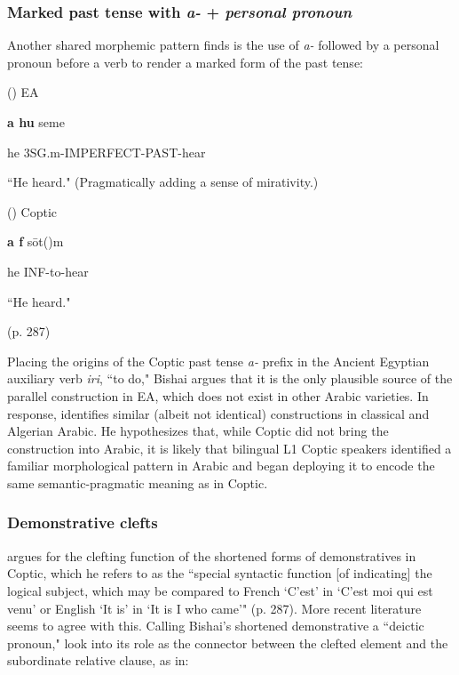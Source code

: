 \documentclass[12pt,a4paper]{article}
\newcounter{example}
\begin{document}
\subsubsection{Marked past tense with \textit{a-} + \textit{personal pronoun}}

Another shared morphemic pattern \textcite{bishai_coptic_1962} finds is the use of \textit{a-} followed by a personal pronoun before a verb to render a marked form of the past tense:

\vspace{3mm}
(\theexample) EA

\textbf{\textglotstop a hu} seme\textrevglotstop

he 3SG.m-IMPERFECT-PAST-hear

``He heard." (Pragmatically adding a sense of mirativity.)

\vspace{3mm}
(\theexample) Coptic

\textbf{\textglotstop a f} sōt(\textschwa)m

he INF-to-hear

``He heard."
\begin{flushright}
(p. 287)
\end{flushright}
Placing the origins of the Coptic past tense \textit{a-} prefix in the Ancient Egyptian auxiliary verb \textit{iri}, ``to do," Bishai argues that it is the only plausible source of the parallel construction in EA, which does not exist in other Arabic varieties. In response, \textcite{palva_notes_1969} identifies similar (albeit not identical) constructions in classical and Algerian Arabic. He hypothesizes that, while Coptic did not bring the construction into Arabic, it is likely that bilingual L1 Coptic speakers identified a familiar morphological pattern in Arabic and began deploying it to encode the same semantic-pragmatic meaning as in Coptic.

\subsubsection{Demonstrative clefts}

\textcite{bishai_coptic_1962} argues for the clefting function of the shortened forms of demonstratives in Coptic, which he refers to as the ``special syntactic function [of indicating] the logical subject, which may be compared to French `C'est' in `C'est moi qui est venu' or English `It is' in `It is I who came'" (p. 287). More recent literature seems to agree with this. Calling Bishai's shortened demonstrative a ``deictic pronoun," \textcite{kiss_nominal_2005} look into its role as the connector between the clefted element and the subordinate relative clause, as in:
\end{document}
